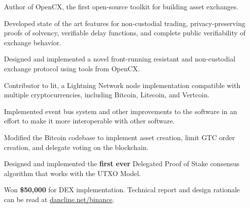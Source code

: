 
\begin{tightemize}
  \item Author of OpenCX, the first open-source toolkit for building asset exchanges.
  \item Developed state of the art features for non-custodial trading, privacy-preserving proofs of solvency, verifiable delay functions, and complete public verifiability of exchange behavior.
  \item Designed and implemented a novel front-running resistant and non-custodial exchange protocol using tools from OpenCX.
\end{tightemize}
\subsectionsep

\begin{tightemize}
  \item Contributor to lit, a Lightning Network node implementation compatible with multiple cryptocurrencies, including Bitcoin, Litecoin, and Vertcoin.
  \item Implemented event bus system and other improvements to the software in an effort to make it more interoperable with other software.
\end{tightemize}
\subsectionsep

\begin{tightemize}
  \item Modified the Bitcoin codebase to implement asset creation, limit GTC
    order creation, and delegate voting on the blockchain.
  \item Designed and implemented the \textbf{first ever} Delegated Proof of
    Stake consensus algorithm that works with the UTXO Model.
  \item Won \textbf{\$50,000} for DEX implementation. Technical report and
    design rationale can be read at
    \href{http://dancline.net/binance/}{dancline.net/binance}.
\end{tightemize}
